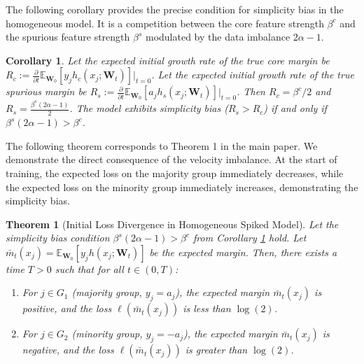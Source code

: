 \documentclass[letter,11pt]{article}
\newtheorem{theorem}{Theorem}
\newtheorem{corollary}{Corollary}
\begin{document}
The following corollary provides the precise condition for simplicity bias in the homogeneous model. It is a competition between the core feature strength $\beta^c$ and the spurious feature strength $\beta^s$ modulated by the data imbalance $2\alpha-1$.
\begin{corollary}\label{cor:homo_bias_condition}
    Let the expected initial growth rate of the true core margin be $R_c := \frac{\partial}{\partial t} \mathbb{E}_{\mathbf{W}_0}[y_j h_c(x_j; \mathbf{W}_t)] \Big|_{t=0}$.
Let the expected initial growth rate of the true spurious margin be $R_s := \frac{\partial}{\partial t} \mathbb{E}_{\mathbf{W}_0}[a_j h_s(x_j; \mathbf{W}_t)] \Big|_{t=0}$.
Then $R_c = \beta^c / 2$ and $R_s = \frac{\beta^s (2\alpha - 1)}{2}$.
The model exhibits simplicity bias ($R_s > R_c$) if and only if $\beta^s (2\alpha - 1) > \beta^c$.
\end{corollary}
The following theorem corresponds to Theorem 1 in the main paper. We demonstrate the direct consequence of the velocity imbalance. At the start of training, the expected loss on the majority group immediately decreases, while the expected loss on the minority group immediately increases, demonstrating the simplicity bias.
\begin{theorem}[Initial Loss Divergence in Homogeneous Spiked Model]\label{thm:homo_loss_divergence}
    Let the simplicity bias condition $\beta^s (2\alpha - 1) > \beta^c$ from Corollary \ref{cor:homo_bias_condition} hold. Let $\bar{m}_t(x_j) = \mathbb{E}_{\mathbf{W}_0}[y_j h(x_j; \mathbf{W}_t)]$ be the expected margin.
Then, there exists a time $T > 0$ such that for all $t \in (0, T)$:
\begin{enumerate}
    \item For $j \in G_1$ (majority group, $y_j = a_j$), the expected margin $\bar{m}_t(x_j)$ is positive, and the loss $\ell(\bar{m}_t(x_j))$ is less than $\log(2)$.
    \item For $j \in G_2$ (minority group, $y_j = -a_j$), the expected margin $\bar{m}_t(x_j)$ is negative, and the loss $\ell(\bar{m}_t(x_j))$ is greater than $\log(2)$.
\end{enumerate}
\end{theorem}
\end{document}
